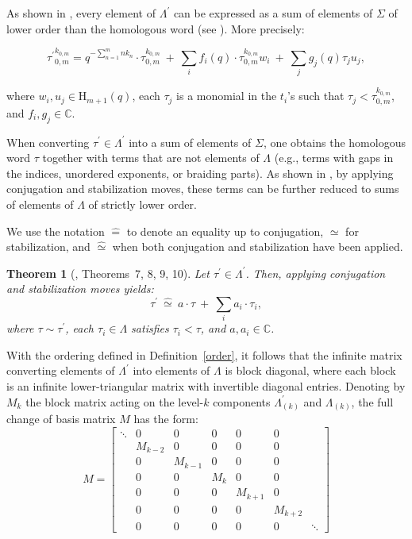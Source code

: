 \documentclass[11pt]{amsart}
\newtheorem{thm}{Theorem}
\begin{document}
As shown in \cite{DL2}, every element of \(\Lambda^{\prime}\) can be expressed as a sum of elements of \(\Sigma\) of lower order than the homologous word (see \cite[Theorem~7]{DL2}). More precisely:

\[
{\tau^{\prime}}_{0,m}^{k_{0,m}}  =
q^{- \sum_{n=1}^{m} n k_n} \cdot {\tau}_{0,m}^{k_{0,m}}
\ +\ \sum_{i} f_i(q) \cdot {\tau}_{0,m}^{k_{0,m}} w_i
\ +\ \sum_{j} g_j(q) \tau_j u_j,
\]

where \(w_i, u_j \in \mathrm{H}_{m+1}(q)\), each \(\tau_j\) is a monomial in the \(t_i\)'s such that \(\tau_j < \tau_{0,m}^{k_{0,m}}\), and \(f_i, g_j \in \mathbb{C}\).

\smallbreak

When converting \(\tau^{\prime} \in \Lambda^{\prime}\) into a sum of elements of \(\Sigma\), one obtains the homologous word \(\tau\) together with terms that are not elements of \(\Lambda\) (e.g., terms with gaps in the indices, unordered exponents, or braiding parts). As shown in \cite{DL2}, by applying conjugation and stabilization moves, these terms can be further reduced to sums of elements of \(\Lambda\) of strictly lower order.

We use the notation \(\widehat{=}\) to denote an equality up to conjugation, \(\simeq\) for stabilization, and \(\widehat{\simeq}\) when both conjugation and stabilization have been applied.

\begin{thm}[\cite{DL2}, Theorems~7, 8, 9, 10] \label{gp}
Let \(\tau^{\prime} \in \Lambda^{\prime}\). Then, applying conjugation and stabilization moves yields:
\[
\tau^{\prime} \ \widehat{\simeq} \ a \cdot \tau\ +\ \sum_{i} a_i \cdot \tau_i,
\]
where \(\tau \sim \tau^{\prime}\), each \(\tau_i \in \Lambda\) satisfies \(\tau_i < \tau\), and \(a, a_i \in \mathbb{C}\).
\end{thm}

With the ordering defined in Definition~\ref{order}, it follows that the infinite matrix converting elements of \(\Lambda^{\prime}\) into elements of \(\Lambda\) is block diagonal, where each block is an infinite lower-triangular matrix with invertible diagonal entries. Denoting by \(M_k\) the block matrix acting on the level-\(k\) components \(\Lambda^{\prime}_{(k)}\) and \(\Lambda_{(k)}\), the full change of basis matrix \(M\) has the form:
\[
M =
\begin{bmatrix}
\ddots & 0 & 0 & 0 & 0 & 0 & \\
& M_{k-2} & 0 & 0 & 0 & 0 & \\
& 0 & M_{k-1} & 0 & 0 & 0 & \\
& 0 & 0 & M_k & 0 & 0 & \\
& 0 & 0 & 0 & M_{k+1} & 0 & \\
& 0 & 0 & 0 & 0 & M_{k+2} & \\
& 0 & 0 & 0 & 0 & 0 & \ddots
\end{bmatrix}
\]
\end{document}
